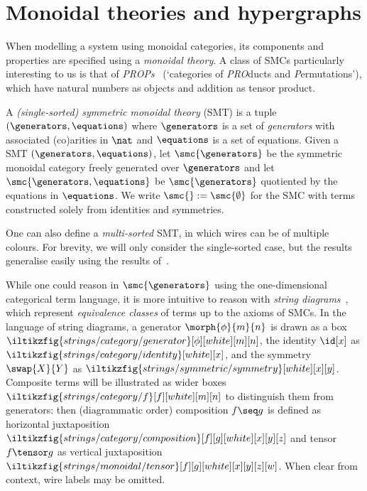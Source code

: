 \section{Monoidal theories and hypergraphs}

When modelling a system using monoidal categories, its components and
properties are specified using a \emph{monoidal theory}.
A class of SMCs particularly interesting to us is that of
\emph{PROPs}~\cite{maclane1965categorical} (`categories of \emph{PRO}ducts and
\emph{P}ermutations'), which have natural numbers as objects and addition as
tensor product.

\begin{definition}
    A \emph{(single-sorted) symmetric monoidal theory} (SMT) is a tuple \(
        (\generators,\equations)
    \) where \(\generators\) is a set of \emph{generators} with associated
    (co)arities in \(\nat\) and \(\equations\) is a set of equations.
    Given a SMT \((\generators,\equations)\), let \(
        \smc{\generators}
    \) be the symmetric monoidal category freely generated over \(\generators\)
    and let \(
        \smc{\generators,\equations}
    \) be \(\smc{\generators}\) quotiented by the equations in \(\equations\).
    We write \(\smc{} := \smc{\emptyset}\) for the SMC with terms constructed
    solely from identities and symmetries.
\end{definition}

\begin{remark}
    One can also define a \emph{multi-sorted} SMT, in which wires can be of
    multiple colours.
    For brevity, we will only consider the single-sorted case, but the results
    generalise easily using the results
    of~\cite{bonchi2022string,bonchi2022stringa}.
\end{remark}

While one could reason in \(\smc{\generators}\) using the
one-dimensional categorical term language, it is more intuitive to reason with
\emph{string diagrams}~\cite{joyal1991geometry,selinger2011survey}, which
represent \emph{equivalence classes} of terms up to the axioms of SMCs.
In the language of string diagrams, a generator \(\morph{\phi}{m}{n}\) is drawn
as a box \(
    \iltikzfig{strings/category/generator}[\phi][white][m][n]
\), the identity \(\id[x]\) as \(
    \iltikzfig{strings/category/identity}[white][x]
\), and the symmetry \(\swap{X}{Y}\) as \(
    \iltikzfig{strings/symmetric/symmetry}[white][x][y]
\).
Composite terms will be illustrated as wider boxes \(
    \iltikzfig{strings/category/f}[f][white][m][n]
\) to distinguish them from generators: then (diagrammatic order) composition
\(f \seq g\) is defined as horizontal juxtaposition \(
    \iltikzfig{strings/category/composition}[f][g][white][x][y][z]
\) and tensor \(f \tensor g\) as vertical juxtaposition \(
    \iltikzfig{strings/monoidal/tensor}[f][g][white][x][y][z][w]
\).
When clear from context, wire labels may be omitted.

